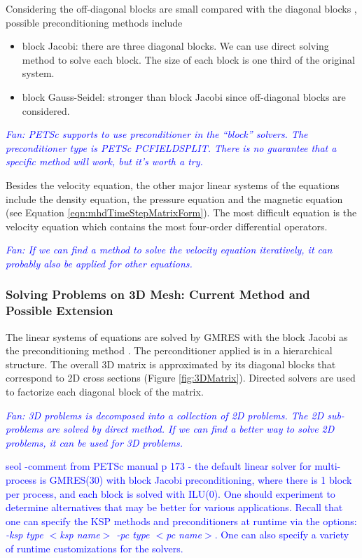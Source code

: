 \documentclass[11pt]{article}  %
\begin{document}
Considering the off-diagonal blocks are small compared with the diagonal blocks \cite{jardin2012multiple},  possible preconditioning methods include \cite{petsc-ug}
\begin{itemize}
\item block Jacobi: there are three diagonal blocks. We can use direct solving method to solve each block. The size of each block is one third of the original system.
\item block Gauss-Seidel:  stronger than block Jacobi since off-diagonal blocks are considered.
\end{itemize}


\textit{ \textcolor{blue}{Fan: PETSc supports to use preconditioner in the ``block'' solvers. The preconditioner type is PETSc PCFIELDSPLIT. There is no guarantee that a specific method will work, but it's worth a try.}}

Besides the velocity equation, the other major linear systems of the equations include the density equation, the pressure equation and the magnetic equation (see Equation \ref{eqn:mhdTimeStepMatrixForm}). The most difficult equation is the velocity equation which contains the most four-order differential operators. 

\textit{ \textcolor{blue}{Fan: If we can find a method to solve the velocity equation iteratively,  it can probably also be applied for other equations.}}

\subsubsection{Solving Problems on 3D Mesh: Current Method and Possible Extension} \label{sec:3Dsolve}
The  linear systems of equations are solved by GMRES with the block Jacobi as the preconditioning method \cite{jardin2012multiple}. The perconditioner  applied is in a hierarchical structure. The overall 3D matrix is approximated by its diagonal blocks  that correspond to  2D cross sections (Figure \ref{fig:3DMatrix}).  Directed solvers are used  to factorize each diagonal block of the matrix.  

\textit{ \textcolor{blue}{Fan: 3D problems is decomposed into a collection of 2D problems. The 2D sub-problems are solved by direct method. If we can find a better way to solve 2D problems, it can be used for 3D problems.}}

\textcolor{blue}{seol -comment from PETSc manual p 173 - the default linear solver for multi-process is GMRES(30) with block Jacobi preconditioning, where there is 1 block per process, and each block is solved with ILU(0). One should experiment to determine alternatives that may be better for various applications. Recall that one can specify the KSP methods and preconditioners at runtime via the options: \emph{-ksp type $<$ksp name$>$ -pc type $<$pc name$>$}. One can also specify a variety of runtime customizations for the solvers.}
\end{document}
